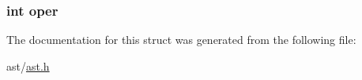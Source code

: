 \subsubsection[{\texorpdfstring{oper}{oper}}]{\setlength{\rightskip}{0pt plus 5cm}int oper}\hypertarget{structoperator_node_type_aded5bacd1ab04cf5d81f2007152472e1}{}\label{structoperator_node_type_aded5bacd1ab04cf5d81f2007152472e1}


The documentation for this struct was generated from the following file\+:\begin{DoxyCompactItemize}
\item 
ast/\hyperlink{ast_8h}{ast.\+h}\end{DoxyCompactItemize}
